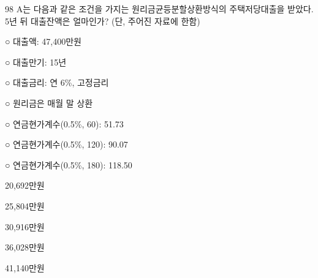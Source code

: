 \begin{question}{98}
A는 다음과 같은 조건을 가지는 원리금균등분할상환방식의 주택저당대출을 받았다. 5년 뒤 대출잔액은 얼마인가? (단, 주어진 자료에 한함)
\begin{framedtext}
○ 대출액: 47,400만원 \par
○ 대출만기: 15년 \par
○ 대출금리: 연 6\%, 고정금리 \par
○ 원리금은 매월 말 상환 \par
○ 연금현가계수(0.5\%, 60): 51.73 \par
○ 연금현가계수(0.5\%, 120): 90.07 \par
○ 연금현가계수(0.5\%, 180): 118.50
\end{framedtext}
\begin{choices}
  \item 20,692만원
  \item 25,804만원
  \item 30,916만원
  \item 36,028만원
  \item 41,140만원
\end{choices}
\end{question}
